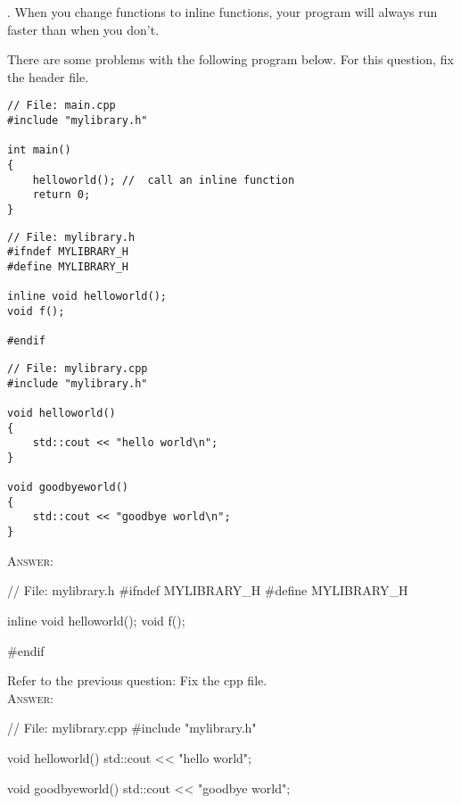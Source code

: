 

\renewcommand\AUTHOR{jdoe5@cougars.ccis.edu} %


\topmattertwo
 

\nextq
\tf. When you change functions to inline functions, your
program will always run faster than when you don't.
\dotfill{}

\nextq
There are some problems with the following program below.
For this question, fix the header file.
\begin{Verbatim}[frame=single,fontsize=\footnotesize]
// File: main.cpp
#include "mylibrary.h"

int main()
{
    helloworld(); //  call an inline function
    return 0;
}
\end{Verbatim}
\begin{Verbatim}[frame=single,fontsize=\footnotesize]
// File: mylibrary.h
#ifndef MYLIBRARY_H
#define MYLIBRARY_H

inline void helloworld();
void f();

#endif
\end{Verbatim}
\begin{Verbatim}[frame=single,fontsize=\footnotesize]
// File: mylibrary.cpp
#include "mylibrary.h"

void helloworld()
{
    std::cout << "hello world\n";
}

void goodbyeworld()
{
    std::cout << "goodbye world\n";
}
\end{Verbatim}
\textsc{Answer:}\vspace{-2mm}
\begin{answercode}
// File: mylibrary.h
#ifndef MYLIBRARY_H
#define MYLIBRARY_H

inline void helloworld();
void f();

#endif
\end{answercode}

\nextq
Refer to the previous question: Fix the cpp file.
\\
\textsc{Answer:}\vspace{-2mm}
\begin{answercode}
// File: mylibrary.cpp
#include "mylibrary.h"

void helloworld()
{
    std::cout << "hello world\n";
}

void goodbyeworld()
{
    std::cout << "goodbye world\n";
}
\end{answercode}

\newpage


